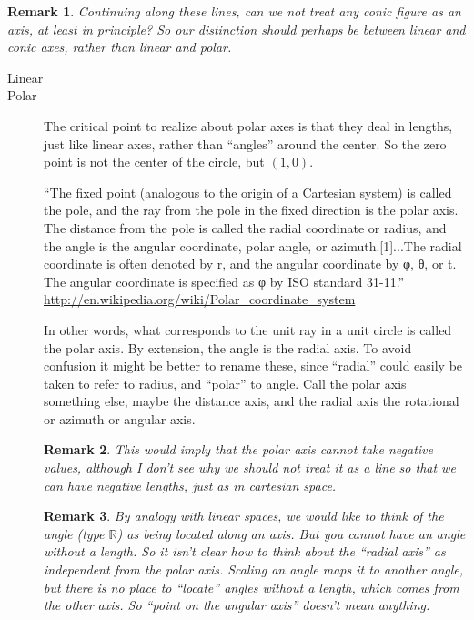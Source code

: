 \documentclass[12pt]{tufte-handout}
\numberwithin{equation}{subsection}
\numberwithin{equation}{subsection}
\newtheorem{remark}{Remark}
\newcommand\R{\(\mathds{R}\)}
\begin{document}
{  \begin{remark}
    Continuing along these lines, can we not treat any conic figure
    as an axis, at least in principle?  So our distinction should
    perhaps be between linear and conic axes, rather than linear and
    polar.
  \end{remark}


  \begin{description}
  \item [Linear]
  \item [Polar]

    The critical point to realize about polar axes is that they deal
    in lengths, just like linear axes, rather than ``angles'' around
    the center.  So the zero point is not the center of the circle,
    but \((1,0)\).


    ``The fixed point (analogous to the origin of a
    Cartesian system) is called the pole, and the ray from the pole
    in the fixed direction is the polar axis. The distance from the
    pole is called the radial coordinate or radius, and the angle is
    the angular coordinate, polar angle, or azimuth.[1]...The radial
    coordinate is often denoted by r, and the angular coordinate by
    φ, θ, or t. The angular coordinate is specified as φ by ISO
    standard 31-11.''
    \url{http://en.wikipedia.org/wiki/Polar_coordinate_system}

    In other words, what corresponds to the unit ray in a unit
    circle is called the polar axis.  By extension, the angle is the
    radial axis.  To avoid confusion it might be better to rename
    these, since ``radial'' could easily be taken to refer to
    radius, and ``polar'' to angle.  Call the polar axis something
    else, maybe the distance axis, and the radial axis the
    rotational or azimuth or angular axis.

    \begin{remark}
      This would imply that the polar axis cannot take negative
      values, although I don't see why we should not treat it as a
      line so that we can have negative lengths, just as in
      cartesian space.
    \end{remark}


    \begin{remark}
      By analogy with linear spaces, we would like to think of the
      angle (type \R) as being located along an axis.  But you
      cannot have an angle without a length.  So it isn't clear how
      to think about the ``radial axis'' as independent from the
      polar axis.  Scaling an angle maps it to another angle, but
      there is no place to ``locate'' angles without a length, which
      comes from the other axis.  So ``point on the angular axis''
      doesn't mean anything.


\end{remark}
\end{description}}
\end{document}
